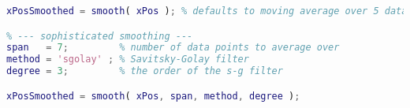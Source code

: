 \begin{lstlisting}[language=matlab]
% --- simple smoothing ---
xPosSmoothed = smooth( xPos ); % defaults to moving average over 5 data points

% --- sophisticated smoothing ---
span   = 7;         % number of data points to average over
method = 'sgolay' ; % Savitsky-Golay filter
degree = 3;         % the order of the s-g filter

xPosSmoothed = smooth( xPos, span, method, degree );

\end{lstlisting}
